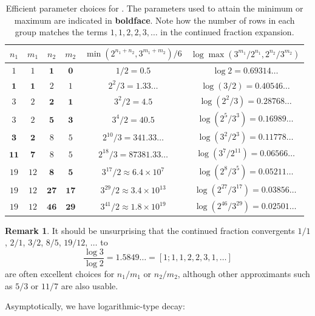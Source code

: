 \documentclass[12pt,a4paper,reqno]{amsart}
\numberwithin{equation}{section}
\theoremstyle{plain}
\theoremstyle{definition}
\newtheorem{remark}[theorem]{Remark}
\begin{document}
\begin{table}[h]
\centering
\begin{tabular}{|c|c|c|c|c|c|}
\hline
$n_1$ & $m_1$ & $n_2$ & $m_2$ & $\min(2^{n_1+n_2},3^{m_1+m_2})/6$ & $\log \max(3^{m_1}/2^{n_1}, 2^{n_2}/3^{m_2})$ \\
\hline
$1$ & $1$ & $\mathbf{1}$ & $\mathbf{0}$ & $1/2 = 0.5$ & $\log 2 = 0.69314\dots$ \\
\hline
$\mathbf{1}$ & $\mathbf{1}$ & $2$ & $1$ & $2^2/3 = 1.33\dots$ & $\log (3/2) = 0.40546\dots$\\
\hline
$3$ & $2$ & $\mathbf{2}$ & $\mathbf{1}$ & $3^2/2 = 4.5$ & $\log (2^2/3) = 0.28768\dots$ \\
$3$ & $2$ & $\mathbf{5}$ & $\mathbf{3}$ & $3^4/2 = 40.5$ & $\log (2^5/3^3) = 0.16989\dots$ \\
\hline
$\mathbf{3}$ & $\mathbf{2}$ & $8$ & $5$ & $2^{10}/3 = 341.33\dots$ & $\log (3^2/2^3) = 0.11778\dots$\\ 
$\mathbf{11}$ & $\mathbf{7}$ & $8$ & $5$ & $2^{18}/3 = 87381.33\dots$ & $\log (3^7/2^{11}) = 0.06566\dots$ \\
\hline
$19$ & $12$ & $\mathbf{8}$ & $\mathbf{5}$ & $3^{17}/2 \approx 6.4 \times 10^7$ & $\log (2^8/3^5) = 0.05211\dots$ \\
$19$ & $12$ & $\mathbf{27}$ & $\mathbf{17}$ & $3^{29}/2 \approx 3.4 \times 10^{13}$ & $\log (2^{27}/3^{17}) = 0.03856\dots$ \\
$19$ & $12$ & $\mathbf{46}$ & $\mathbf{29}$ & $3^{41}/2 \approx 1.8 \times 10^{19} $ & $\log (2^{46}/3^{29}) = 0.02501\dots$ \\
\hline
\end{tabular}
\caption{Efficient parameter choices for .  The parameters used to attain the minimum or maximum are indicated in \textbf{boldface}. Note how the number of rows in each group matches the terms $1,1,2,2,3,\dots$ in the continued fraction expansion.}\label{approx-table}
\end{table}

\begin{remark}
It should be unsurprising that the continued fraction convergents $1/1$, $2/1$, $3/2$, $8/5$, $19/12$, $\dots$ to 
$$\frac{\log 3}{\log 2} = 1.5849\dots = [1; 1,1,2,2,3,1,\dots]$$
are often excellent choices for $n_1/m_1$ or $n_2/m_2$, although other approximants such as $5/3$ or $11/7$ are also usable.
\end{remark}

Asymptotically, we have logarithmic-type decay:
\end{document}
